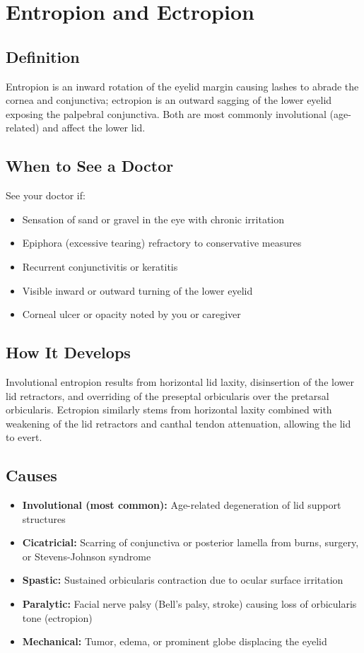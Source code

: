 \chapter{Entropion and Ectropion}

\section*{Definition}
Entropion is an inward rotation of the eyelid margin causing lashes to abrade the cornea and conjunctiva; ectropion is an outward sagging of the lower eyelid exposing the palpebral conjunctiva. Both are most commonly involutional (age-related) and affect the lower lid.

\section*{When to See a Doctor}
See your doctor if:
\begin{itemize}
  \item Sensation of sand or gravel in the eye with chronic irritation
  \item Epiphora (excessive tearing) refractory to conservative measures
  \item Recurrent conjunctivitis or keratitis
  \item Visible inward or outward turning of the lower eyelid
  \item Corneal ulcer or opacity noted by you or caregiver
\end{itemize}

\section*{How It Develops}
Involutional entropion results from horizontal lid laxity, disinsertion of the lower lid retractors, and overriding of the preseptal orbicularis over the pretarsal orbicularis. Ectropion similarly stems from horizontal laxity combined with weakening of the lid retractors and canthal tendon attenuation, allowing the lid to evert.

\section*{Causes}
\begin{itemize}
  \item \textbf{Involutional (most common):} Age-related degeneration of lid support structures
  \item \textbf{Cicatricial:} Scarring of conjunctiva or posterior lamella from burns, surgery, or Stevens-Johnson syndrome
  \item \textbf{Spastic:} Sustained orbicularis contraction due to ocular surface irritation
  \item \textbf{Paralytic:} Facial nerve palsy (Bell's palsy, stroke) causing loss of orbicularis tone (ectropion)
  \item \textbf{Mechanical:} Tumor, edema, or prominent globe displacing the eyelid
\end{itemize}

